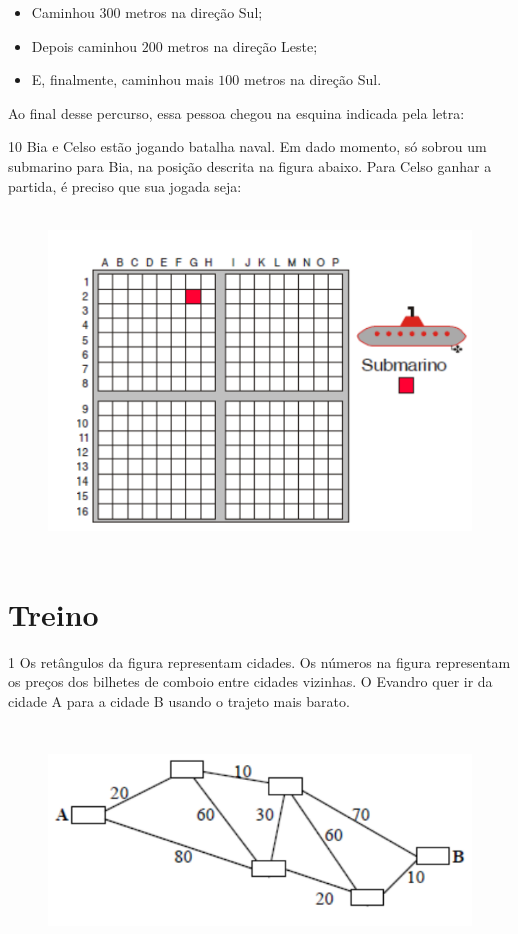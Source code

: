 \begin{itemize}
\item Caminhou $300$ metros na direção Sul;
\item Depois caminhou $200$ metros na direção Leste;
\item E, finalmente, caminhou mais $100$ metros na direção Sul.
\end{itemize}

Ao final desse percurso, essa pessoa chegou na esquina indicada pela
letra: 

\num{10} Bia e Celso estão jogando batalha naval. Em dado momento, só sobrou
um submarino para Bia, na posição descrita na figura abaixo. Para Celso ganhar a partida, é preciso que sua jogada seja:

\begin{figure}
\includegraphics[width=5in,height=3.55208in]{./imgSAEB_6_MAT/media/image73.png}
\end{figure}


\section{Treino}

\num{1}  Os retângulos da figura representam cidades. Os números na figura
representam os preços dos bilhetes de comboio entre cidades vizinhas. O
Evandro quer ir da cidade A para a cidade B usando o trajeto mais
barato.

\begin{figure}
\includegraphics[width=5.90625in,height=2.38542in]{./imgSAEB_6_MAT/media/image74.png}
\end{figure}

